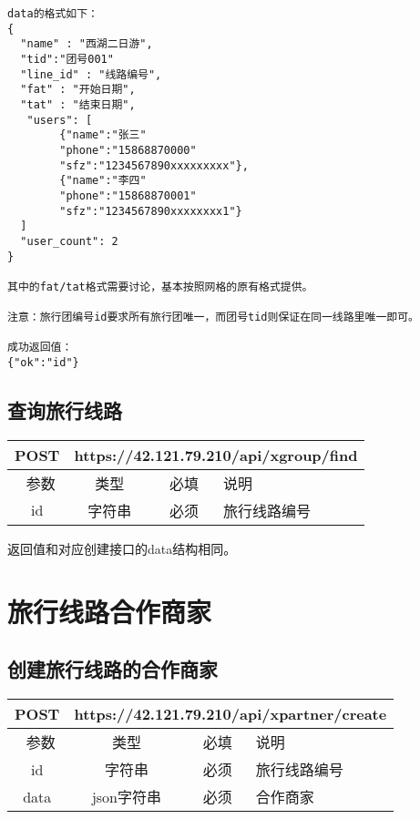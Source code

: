 \documentclass[cs4size]{ctexartutf8}
\begin{document}
\begin{verbatim}
data的格式如下：
{
  "name" : "西湖二日游",
  "tid":"团号001"
  "line_id" : "线路编号",
  "fat" : "开始日期",
  "tat" : "结束日期",
   "users": [
        {"name":"张三"
        "phone":"15868870000"
        "sfz":"1234567890xxxxxxxxx"},
        {"name":"李四"
        "phone":"15868870001"
        "sfz":"1234567890xxxxxxxx1"}
  ]
  "user_count": 2
}

其中的fat/tat格式需要讨论，基本按照网格的原有格式提供。

注意：旅行团编号id要求所有旅行团唯一，而团号tid则保证在同一线路里唯一即可。

成功返回值：
{"ok":"id"}
\end{verbatim}



\subsection{查询旅行线路}

\begin{table}[H]
   \begin{center}
\begin{tabular}{|c|c|c|p{12cm}|}
\hline
POST & \multicolumn{3}{|c|}{https://42.121.79.210/api/xgroup/find} \\
\hline\hline
 \  参数  & 类型 & 必填 &  说明  \\
 \hline
 id  & 字符串 & 必须 &  旅行线路编号\\
\hline
\end{tabular}
   \end{center}
\end{table}
返回值和对应创建接口的data结构相同。


\section{旅行线路合作商家}

\subsection{创建旅行线路的合作商家}

\begin{table}[H]
   \begin{center}
\begin{tabular}{|c|c|c|p{12cm}|}
\hline
POST & \multicolumn{3}{|c|}{https://42.121.79.210/api/xpartner/create} \\
\hline\hline
 \  参数  & 类型 & 必填 &  说明  \\
 \hline
 id  & 字符串 & 必须 &  旅行线路编号\\
\hline
 data  & json字符串 & 必须 &  合作商家\\
\hline
\end{tabular}
   \end{center}
\end{table}
\end{document}
